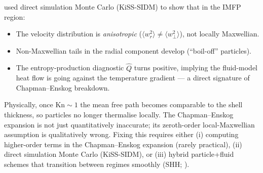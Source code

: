 \documentclass[12pt]{article}
\begin{document}
\citet{Gurian2025Core} used direct simulation Monte Carlo
(KiSS-SIDM) to show that in the IMFP region:
%
\begin{itemize}
  \item The velocity distribution is \emph{anisotropic}
        ($\langle w_r^2\rangle \neq \langle w_\perp^2\rangle$), not
        locally Maxwellian.
  \item Non-Maxwellian tails in the radial component develop
        (``boil-off'' particles).
  \item The entropy-production diagnostic $\hat Q$ turns positive,
        implying the fluid-model heat flow is going against the
        temperature gradient --- a direct signature of Chapman--Enskog
        breakdown.
\end{itemize}
%
Physically, once $\mathrm{Kn}\sim 1$ the mean free path becomes
comparable to the shell thickness, so particles no longer thermalise
locally.  The Chapman--Enskog expansion is not just quantitatively
inaccurate; its zeroth-order local-Maxwellian assumption is
qualitatively wrong.  Fixing this requires either (i) computing
higher-order terms in the Chapman--Enskog expansion (rarely
practical), (ii) direct simulation Monte Carlo (KiSS-SIDM), or
(iii) hybrid particle+fluid schemes that transition between regimes
smoothly (SHH; \citealt{Schon2025}).


\end{document}
